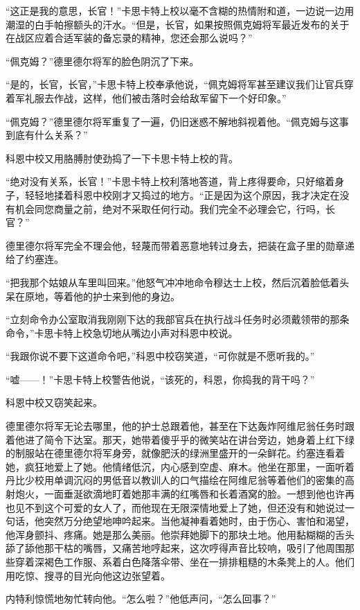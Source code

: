     “这正是我的意思，长官！”卡思卡特上校以毫不含糊的热情附和道，一边说一边用潮湿的白手帕擦额头的汗水。“但是，长官，如果按照佩克姆将军最近发布的关于在战区应着合适军装的备忘录的精神，您还会那么说吗？”

    “佩克姆？”德里德尔将军的脸色阴沉了下来。

    “是的，长官，长官，”卡思卡特上校奉承他说，“佩克姆将军甚至建议我们让官兵穿着军礼服去作战，这样，他们被击落时会给敌军留下一个好印象。”

    “佩克姆？”德里德尔将军重复了一遍，仍旧迷惑不解地斜视着他。“佩克姆与这事到底有什么关系？”

    科恩中校又用胳膊肘使劲捣了一下卡思卡特上校的背。

    “绝对没有关系，长官！”卡思卡特上校利落地答道，背上疼得要命，只好缩着身子，轻轻地揉着科恩中校刚才又捣过的地方。“正是因为这个原因，我才决定在没有机会同您商量之前，绝对不采取任何行动。我们完全不必理会它，行吗，长官？”

    德里德尔将军完全不理会他，轻蔑而带着恶意地转过身去，把装在盒子里的勋章递给了约塞连。

    “把我那个姑娘从车里叫回来。”他怒气冲冲地命令穆达士上校，然后沉着脸低着头呆在原地，等着他的护士来到他的身边。

    “立刻命令办公室取消我刚刚下达的我部官兵在执行战斗任务时必须戴领带的那条命令，”卡思卡特上校急切地从嘴边小声对科恩中校说。

    “我跟你说不要下这道命令吧，”科恩中校窃笑道，“可你就是不愿听我的。”

    “嘘——！”卡思卡特上校警告他说，“该死的，科恩，你捣我的背干吗？”

    科恩中校又窃笑起来。

    德里德尔将军无论去哪里，他的护士总跟着他，甚至在下达轰炸阿维尼翁任务时跟着他进了简令下达室。那天，她带着傻乎乎的微笑站在讲台旁边，她身着上红下绿的制服站在德里德尔将军身旁，就像肥沃的绿洲里盛开的一朵鲜花。约塞连看着她，疯狂地爱上了她。他情绪低沉，内心感到空虚、麻木。他坐在那里，一面听着丹比少校用单调沉闷的男低音以教训人的口气描绘在阿维尼翁等着他们的密集的高射炮火，一面垂涎欲滴地盯着她那丰满的红嘴唇和长着酒窝的脸。一想到他也许再也见不到这个可爱的女人了，而他现在无限深情地爱上了她，但还没有和她说过一句话，他突然万分绝望地呻吟起来。当他凝神看着她时，由于伤心、害怕和渴望，他浑身颤抖、疼痛。她是那么美丽。他崇拜她脚下的那块土地。他用黏糊糊的舌头舔了舔他那干枯的嘴唇，又痛苦地哼起来，这次哼得声音比较响，吸引了他周围那些穿着深褐色工作服、系着白色降落伞带、坐在一排排粗糙的木条凳上的人。他们用吃惊、搜寻的目光向他这边张望着。

    内特利惊慌地匆忙转向他。“怎么啦？”他低声问，“怎么回事？”

